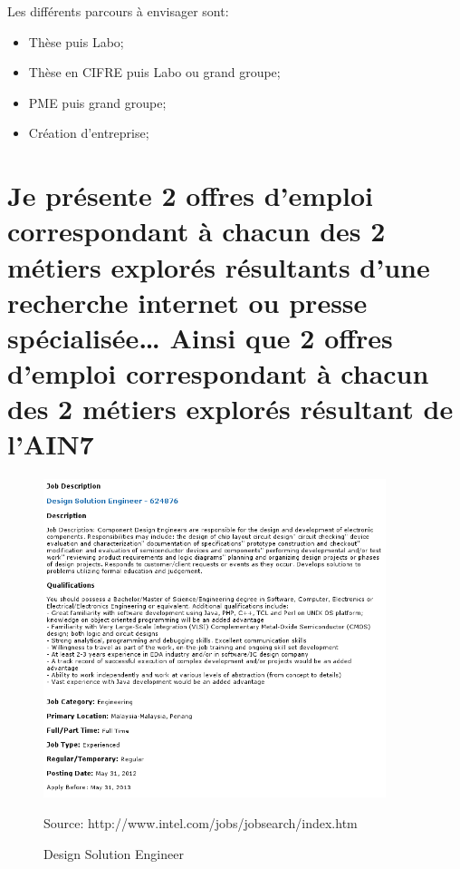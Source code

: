 \documentclass[10pt]{article}
\begin{document}
Les différents parcours à envisager sont:
\begin{itemize}
    \item Thèse puis Labo;
    \item Thèse en CIFRE puis Labo ou grand groupe;
    \item PME puis grand groupe;
    \item Création d’entreprise;
\end{itemize}

\section{Je présente 2 offres d’emploi correspondant à chacun des 2 métiers explorés résultants d’une
    recherche internet ou presse spécialisée… Ainsi que 2 offres d’emploi correspondant à chacun des 2 métiers
explorés résultant de l’AIN7}

\begin{figure}
    \begin{center}
        \includegraphics[width=10cm]{intel}
    \end{center}
    \caption{Design Solution Engineer}
    Source: http://www.intel.com/jobs/jobsearch/index.htm
\end{figure}
\end{document}
